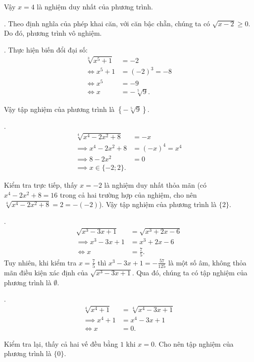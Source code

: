 Vậy $x = 4$ là nghiệm duy nhất của phương trình.

. Theo định nghĩa của phép khai căn, với căn bậc chẵn, chúng ta có $\sqrt{x - 2} \geq 0$. Do đó, phương trình vô nghiệm.

. Thực hiện biến đổi đại số:
\begin{align*}
   \sqrt[3]{x^5 + 1} &= -2 \\
   \iff x^5 + 1 &= (-2)^3 = -8 \\
   \iff x^5 &= -9 \\
   \iff x &= -\sqrt[5]{9}.
\end{align*}

Vậy tập nghiệm của phương trình là $\left\{-\sqrt[5]{9}\right\}$.

.
\begin{align*}
   \sqrt[4]{x^4-2x^2+8} &= -x \\
   \implies x^4 - 2x^2 + 8 &= (-x)^4 = x^4 \\
   \implies 8 - 2x^2 &= 0 \\
   \implies x \in \{-2; 2\}.
\end{align*}

Kiểm tra trực tiếp, thấy $x = -2$ là nghiệm duy nhất thỏa mãn (có $x^4-2x^2+8 = 16$ trong cả hai trường hợp của nghiệm, cho nên $\sqrt[4]{x^4-2x^2+8} = 2 = -(-2)$). Vậy tập nghiệm của phương trình là $\{2\}$.

.
\begin{align*}
   \sqrt{x^3-3x+1} &= \sqrt{x^3+2x-6} \\
   \implies x^3-3x+1 &= x^3 + 2x - 6 \\
   \iff x &= \frac{7}{5}.
\end{align*}
Tuy nhiên, khi kiểm tra $x = \frac{7}{5}$ thì $x^3 - 3x + 1 = -\frac{57}{125}$ là một số âm, không thỏa mãn điều kiện xác định của $\sqrt{x^3-3x+1}$. Qua đó, chúng ta có tập nghiệm của phương trình là $\emptyset$.

.
\begin{align*}
   \sqrt[4]{x^4 + 1} &= \sqrt[4]{x^4 - 3x + 1} \\
   \implies x^4 + 1 &= x^4 - 3x + 1 \\
   \iff x &= 0. 
\end{align*}

Kiểm tra lại, thấy cả hai vế đều bằng $1$ khi $x = 0$. Cho nên tập nghiệm của phương trình là $\{0\}$.

